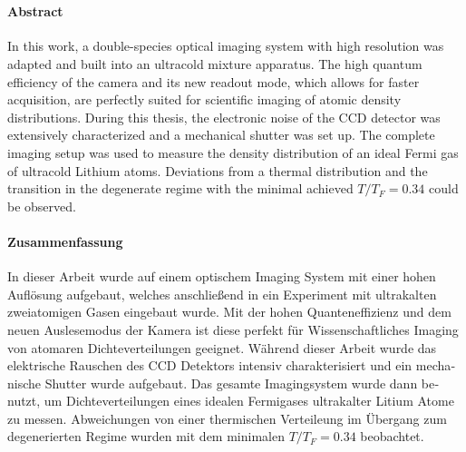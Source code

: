 \cleardoublepage
\thispagestyle{plain}

\makeatletter
\begin{center}
	\large\textbf{\@title}\\
	\normalsize\@author
\end{center}
\makeatother

\paragraph{Abstract}
In this work, a double-species optical imaging system with high resolution was adapted and built into an ultracold mixture apparatus. The high quantum efficiency of the camera and its new readout mode, which allows for faster acquisition, are perfectly suited for scientific imaging of atomic density distributions. During this thesis, the electronic noise of the CCD detector was extensively characterized and a mechanical shutter was set up. The complete imaging setup was used to measure the density distribution of an ideal Fermi gas of ultracold Lithium atoms. Deviations from a thermal distribution and the transition in the degenerate regime with the minimal achieved $T/T_F=0.34$ could be observed.


\begin{otherlanguage}{ngerman}

\paragraph{Zusammenfassung}
In dieser Arbeit wurde auf einem optischem Imaging System mit einer hohen Auflösung aufgebaut, welches anschließend in ein Experiment mit ultrakalten zweiatomigen Gasen eingebaut wurde. Mit der hohen Quanteneffizienz und dem neuen Auslesemodus der Kamera ist diese perfekt für Wissenschaftliches Imaging von atomaren Dichteverteilungen geeignet. Während dieser Arbeit wurde das elektrische Rauschen des CCD Detektors intensiv charakterisiert und ein mechanische Shutter wurde aufgebaut. Das gesamte Imagingsystem wurde dann benutzt, um Dichteverteilungen eines idealen Fermigases ultrakalter Litium Atome zu messen. Abweichungen von einer thermischen Verteileung im Übergang zum degenerierten Regime wurden mit dem minimalen $T/T_F=0.34$ beobachtet.

\end{otherlanguage}
